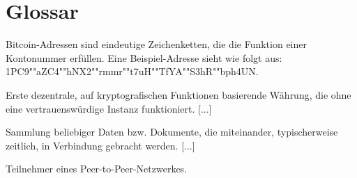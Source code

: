 \documentclass[
    twoside=true,
    fontsize=11pt,
    DIV=15,
    BCOR=17mm,
    headsepline=true, footsepline=false,
    open=right,
    a4paper,
    listof=totoc, bibliography=totoc,
    headinclude=true, footinclude=false,
    parskip=half,
    numbers=noenddot,
    ngerman
]{scrbook}
\begin{document}
    \blindtext

    
    \chapter*{Glossar}
     Bitcoin-Adressen sind eindeutige Zeichenketten, die die Funktion einer Kontonummer erfüllen.
        Eine Beispiel-Adresse sieht wie folgt aus: 1PC9""aZC4""hNX2""rmmr""t7uH""TfYA""S3hR""bph4UN.
    
     Erste dezentrale, auf kryptografischen Funktionen basierende Währung, die ohne eine vertrauenswürdige Instanz funktioniert. [...]
    
     Sammlung beliebiger Daten bzw. Dokumente, die miteinander, typischerweise zeitlich, in Verbindung gebracht werden. [...]
    
     Teilnehmer eines Peer-to-Peer-Netzwerkes.
    
    
    
    \printbibliography
    
\end{document}
